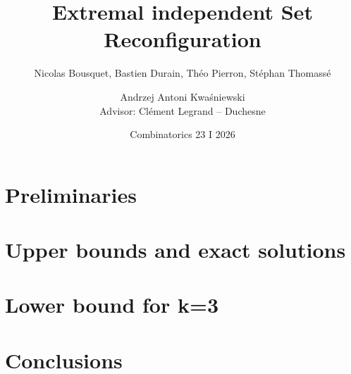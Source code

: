 \documentclass[aspectratio=169]{beamer}
\title[Title]{Extremal independent Set Reconfiguration}
\subtitle{ Nicolas Bousquet, Bastien Durain, Théo Pierron, Stéphan Thomassé}
\author{Andrzej Antoni Kwaśniewski \\ 
Advisor: Clément Legrand – Duchesne}
\date[]{Combinatorics 23 I 2026}
\begin{document}
\onehalfspacing

\frame{\titlepage}

\section{Preliminaries}


\section{Upper bounds and exact solutions}

\section{Lower bound for k=3}

\section{Conclusions}




\end{document}
